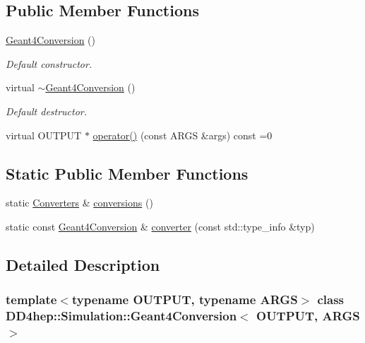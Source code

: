 \subsection*{Public Member Functions}
\begin{DoxyCompactItemize}
\item 
\hyperlink{class_d_d4hep_1_1_simulation_1_1_geant4_conversion_a1c01751a147e2f8f59c5def99d3b610c}{Geant4\+Conversion} ()
\begin{DoxyCompactList}\small\item\em Default constructor. \end{DoxyCompactList}\item 
virtual \hyperlink{class_d_d4hep_1_1_simulation_1_1_geant4_conversion_ad45a38e4466edfe39670a783931bdbe6}{$\sim$\+Geant4\+Conversion} ()
\begin{DoxyCompactList}\small\item\em Default destructor. \end{DoxyCompactList}\item 
virtual O\+U\+T\+P\+UT $\ast$ \hyperlink{class_d_d4hep_1_1_simulation_1_1_geant4_conversion_afab79d045509dd073e3c5d435ff84dc2}{operator()} (const A\+R\+GS \&args) const =0
\end{DoxyCompactItemize}
\subsection*{Static Public Member Functions}
\begin{DoxyCompactItemize}
\item 
static \hyperlink{class_d_d4hep_1_1_simulation_1_1_geant4_conversion_a1e6c074730135cc207cbd8d8030a189f}{Converters} \& \hyperlink{class_d_d4hep_1_1_simulation_1_1_geant4_conversion_ab9cbccbc85006e7c05a09e89b9b7a93f}{conversions} ()
\item 
static const \hyperlink{class_d_d4hep_1_1_simulation_1_1_geant4_conversion}{Geant4\+Conversion} \& \hyperlink{class_d_d4hep_1_1_simulation_1_1_geant4_conversion_ae3cf2cfa3d9381220a8865943a496ff5}{converter} (const std\+::type\+\_\+info \&typ)
\end{DoxyCompactItemize}


\subsection{Detailed Description}
\subsubsection*{template$<$typename O\+U\+T\+P\+UT, typename A\+R\+GS$>$\newline
class D\+D4hep\+::\+Simulation\+::\+Geant4\+Conversion$<$ O\+U\+T\+P\+U\+T, A\+R\+G\+S $>$}

